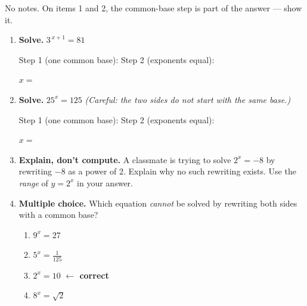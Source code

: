 \documentclass[10pt]{article}
\begin{document}
\namedateperiod

\vspace{0.08in}

No notes. On items 1 and 2, the common-base step is part of the answer --- show it.

\begin{enumerate}[leftmargin=1.8em, itemsep=12pt]
  \item \textbf{Solve.} \quad $3^{\,x+1}=81$

        \vspace{4pt}
        Step 1 (one common base):  \quad Step 2 (exponents equal):

        \vspace{5pt}
        \hfill $x=$ 

  \item \textbf{Solve.} \quad $25^{x}=125$ \quad \emph{(Careful: the two sides do not start with the
        same base.)}

        \vspace{4pt}
        Step 1 (one common base):  \quad Step 2 (exponents equal):

        \vspace{5pt}
        \hfill $x=$ 

  \item \textbf{Explain, don't compute.} A classmate is trying to solve $2^{x}=-8$ by rewriting $-8$
        as a power of $2$. Explain why no such rewriting exists. Use the \emph{range} of $y=2^{x}$ in
        your answer.

        \vspace{2pt}

  \item \textbf{Multiple choice.} Which equation \emph{cannot} be solved by rewriting both sides with
        a common base?
        \begin{enumerate}[label=\Alph*., leftmargin=1.9em, itemsep=1pt]
          \item $9^{x}=27$
          \item $5^{x}=\frac{1}{125}$
          \item $2^{x}=10$ \quad \textcolor{keyred}{\textbf{$\leftarrow$ correct}}
          \item $8^{x}=\sqrt{2}$
        \end{enumerate}


\end{enumerate}
\end{document}
